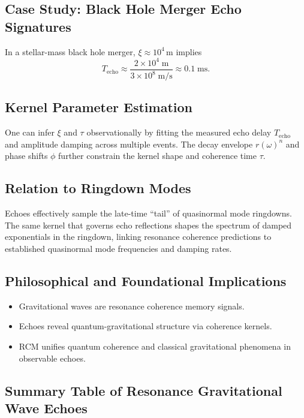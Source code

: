 \subsection{Case Study: Black Hole Merger Echo Signatures}

In a stellar-mass black hole merger, \(\xi\approx10^4\)\,m implies
\[
T_{\mathrm{echo}} \approx \frac{2\times10^4\;\mathrm{m}}{3\times10^8\;\mathrm{m/s}}
\approx 0.1\;\mathrm{ms}.
\]

\subsection{Kernel Parameter Estimation}

One can infer \(\xi\) and \(\tau\) observationally by fitting the measured echo delay \(T_{\mathrm{echo}}\) and amplitude damping across multiple events. The decay envelope \(r(\omega)^n\) and phase shifts \(\phi\) further constrain the kernel shape and coherence time \(\tau\).

\subsection{Relation to Ringdown Modes}

Echoes effectively sample the late-time “tail” of quasinormal mode ringdowns. The same kernel that governs echo reflections shapes the spectrum of damped exponentials in the ringdown, linking resonance coherence predictions to established quasinormal mode frequencies and damping rates.

\subsection{Philosophical and Foundational Implications}

\begin{itemize}
  \item Gravitational waves are resonance coherence memory signals.
  \item Echoes reveal quantum-gravitational structure via coherence kernels.
  \item RCM unifies quantum coherence and classical gravitational phenomena in observable echoes.
\end{itemize}

\subsection{Summary Table of Resonance Gravitational Wave Echoes}

